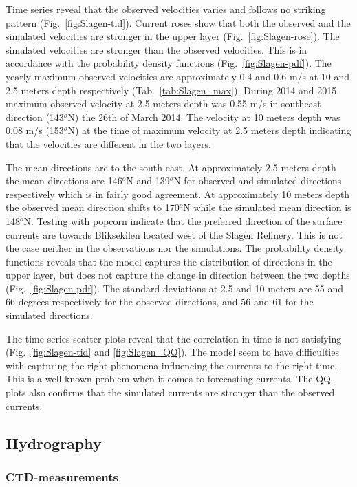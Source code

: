 Time series reveal that the observed velocities varies and follows no striking pattern (Fig.~\ref{fig:Slagen-tid}).
Current roses show that both the observed and the simulated velocities are stronger in the upper layer (Fig.~\ref{fig:Slagen-rose}). The simulated velocities are stronger than the observed velocities. This is in accordance with the probability density functions (Fig.~\ref{fig:Slagen-pdf}). The yearly maximum observed velocities are approximately 0.4 and 0.6 m/s at 10 and 2.5 meters depth respectively (Tab.~\ref{tab:Slagen_max}). During 2014 and 2015 maximum observed velocity at 2.5 meters depth was 0.55 m/s in southeast direction (143$^o$N) the 26th of March 2014. The velocity at 10 meters depth was 0.08 m/s (153$^o$N) at the time of maximum velocity at 2.5 meters depth indicating that the velocities are different in the two layers.

The mean directions are to the south east. At approximately 2.5 meters depth the mean directions are 146$^o$N and 139$^o$N for observed and simulated directions respectively which is in fairly good agreement. At approximately 10 meters depth the observed mean direction shifts to 170$^o$N while the simulated mean direction is 148$^o$N. 
Testing with popcorn indicate that the preferred direction of the surface currents are towards Bliksekilen located west of the Slagen Refinery. This is not the case neither in the observations nor the simulations.
The probability density functions reveals that the model captures the distribution of directions in the upper layer, but does not capture the change in direction between the two depths (Fig.~\ref{fig:Slagen-pdf}). The standard deviations at 2.5 and 10 meters are 55 and 66 degrees respectively for the observed directions, and 56 and 61 for the simulated directions.

The time series scatter plots reveal that the correlation in time is not satisfying (Fig.~\ref{fig:Slagen-tid} and \ref{fig:Slagen_QQ}). The model seem to have difficulties with capturing the right phenomena influencing the currents to the right time. This is a well known problem when it comes to forecasting currents. The QQ-plots also confirms that the simulated currents are stronger than the observed currents. 


\clearpage

\subsection{Hydrography}

\subsubsection{CTD-measurements}

